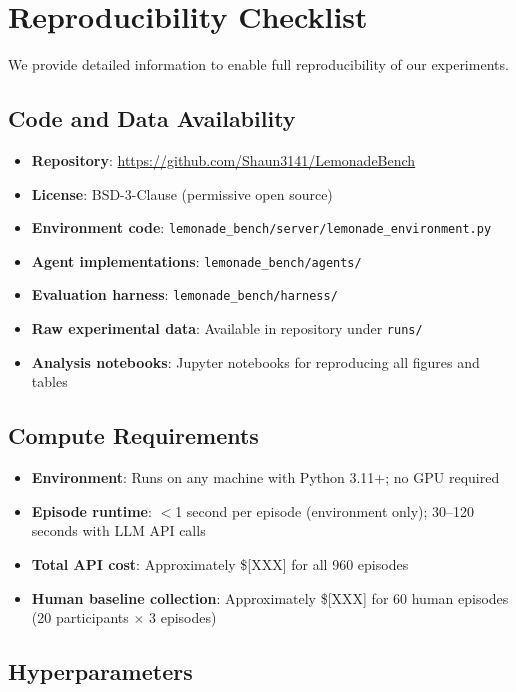 \section{Reproducibility Checklist}
\label{app:reproducibility}

We provide detailed information to enable full reproducibility of our experiments.

\subsection{Code and Data Availability}

\begin{itemize}
    \item \textbf{Repository}: \url{https://github.com/Shaun3141/LemonadeBench}
    \item \textbf{License}: BSD-3-Clause (permissive open source)
    \item \textbf{Environment code}: \texttt{lemonade\_bench/server/lemonade\_environment.py}
    \item \textbf{Agent implementations}: \texttt{lemonade\_bench/agents/}
    \item \textbf{Evaluation harness}: \texttt{lemonade\_bench/harness/}
    \item \textbf{Raw experimental data}: Available in repository under \texttt{runs/}
    \item \textbf{Analysis notebooks}: Jupyter notebooks for reproducing all figures and tables
\end{itemize}

\subsection{Compute Requirements}

\begin{itemize}
    \item \textbf{Environment}: Runs on any machine with Python 3.11+; no GPU required
    \item \textbf{Episode runtime}: $<$1 second per episode (environment only); 30--120 seconds with LLM API calls
    \item \textbf{Total API cost}: Approximately \$[XXX] for all 960 episodes
    \item \textbf{Human baseline collection}: Approximately \$[XXX] for 60 human episodes (20 participants $\times$ 3 episodes)
\end{itemize}

\subsection{Hyperparameters}

